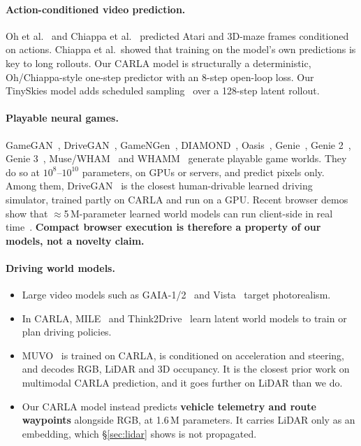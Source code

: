 \documentclass[11pt]{article}
\begin{document}
\paragraph{Action-conditioned video prediction.} Oh et al.~\cite{oh2015action} and Chiappa et al.~\cite{chiappa2017recurrent} predicted Atari and 3D-maze frames conditioned on actions. Chiappa et al.\ showed that training on the model's own predictions is key to long rollouts. Our CARLA model is structurally a deterministic, Oh/Chiappa-style one-step predictor with an 8-step open-loop loss. Our TinySkies model adds scheduled sampling~\cite{bengio2015scheduled} over a 128-step latent rollout.

\paragraph{Playable neural games.} GameGAN~\cite{kim2020gamegan}, DriveGAN~\cite{kim2021drivegan}, GameNGen~\cite{valevski2025gamengen}, DIAMOND~\cite{alonso2024diamond}, Oasis~\cite{decart2024oasis}, Genie~\cite{bruce2024genie}, Genie 2~\cite{deepmind2024genie2}, Genie 3~\cite{parkerholder2025genie3}, Muse/WHAM~\cite{kanervisto2025wham} and WHAMM~\cite{microsoft2025whamm} generate playable game worlds. They do so at $10^{8}$--$10^{10}$ parameters, on GPUs or servers, and predict pixels only. Among them, DriveGAN~\cite{kim2021drivegan} is the closest human-drivable learned driving simulator, trained partly on CARLA and run on a GPU. Recent browser demos show that $\approx$5\,M-parameter learned world models can run client-side in real time~\cite{boerbohan2025world,kumar2025flappy}. \textbf{Compact browser execution is therefore a property of our models, not a novelty claim.}

\paragraph{Driving world models.}
\begin{itemize}
  \item Large video models such as GAIA-1/2~\cite{hu2023gaia1,russell2025gaia2} and Vista~\cite{gao2024vista} target photorealism.
  \item In CARLA, MILE~\cite{hu2022mile} and Think2Drive~\cite{li2024think2drive} learn latent world models to train or plan driving policies.
  \item MUVO~\cite{bogdoll2025muvo} is trained on CARLA, is conditioned on acceleration and steering, and decodes RGB, LiDAR and 3D occupancy. It is the closest prior work on multimodal CARLA prediction, and it goes further on LiDAR than we do.
  \item Our CARLA model instead predicts \textbf{vehicle telemetry and route waypoints} alongside RGB, at 1.6\,M parameters. It carries LiDAR only as an embedding, which \S\ref{sec:lidar} shows is not propagated.
\end{itemize}
\end{document}

